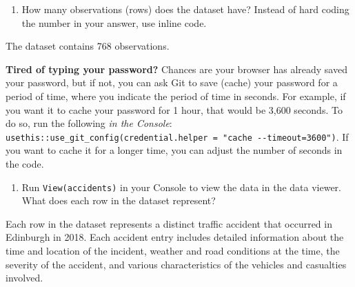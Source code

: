 \documentclass[
]{article}
\providecommand{\tightlist}{%
  \setlength{\itemsep}{0pt}\setlength{\parskip}{0pt}}
\begin{document}
\begin{enumerate}
\def\labelenumi{\arabic{enumi}.}
\tightlist
\item
  How many observations (rows) does the dataset have? Instead of hard
  coding the number in your answer, use inline code.
\end{enumerate}

The dataset contains 768 observations.

\textbf{Tired of typing your password?} Chances are your browser has
already saved your password, but if not, you can ask Git to save (cache)
your password for a period of time, where you indicate the period of
time in seconds. For example, if you want it to cache your password for
1 hour, that would be 3,600 seconds. To do so, run the following
\emph{in the Console}:
\texttt{usethis::use\_git\_config(credential.helper\ =\ "cache\ -\/-timeout=3600")}.
If you want to cache it for a longer time, you can adjust the number of
seconds in the code.

\begin{enumerate}
\def\labelenumi{\arabic{enumi}.}
\setcounter{enumi}{1}
\tightlist
\item
  Run \texttt{View(accidents)} in your Console to view the data in the
  data viewer. What does each row in the dataset represent?
\end{enumerate}

Each row in the dataset represents a distinct traffic accident that
occurred in Edinburgh in 2018. Each accident entry includes detailed
information about the time and location of the incident, weather and
road conditions at the time, the severity of the accident, and various
characteristics of the vehicles and casualties involved.
\end{document}
